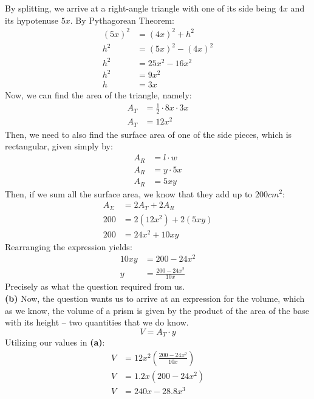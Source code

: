 \documentclass[hidelinks, a4paper, 12pt]{article}
\newcommand{\bd}{\textbf}
\newcommand{\n}{\\[\baselineskip]}
\begin{document}
            By splitting, we arrive at a right-angle triangle with one of its side being $4x$ and its hypotenuse $5x$. By Pythagorean Theorem:
            \[\begin{split}
                (5x)^2 &= (4x)^2 + h^2\\
                h^2 &= (5x)^2 - (4x)^2\\
                h^2 &= 25x^2 - 16x^2\\
                h^2 &= 9x^2\\
                h &= 3x
            \end{split}\]
            Now, we can find the area of the triangle, namely:
            \[\begin{split}
                A_T &= \frac{1}{2}\cdot 8x \cdot 3x\\
                A_T &= 12x^2
            \end{split}\]
            Then, we need to also find the surface area of one of the side pieces, which is rectangular, given simply by:
            \[\begin{split}
                A_R &= l \cdot w\\
                A_R &= y \cdot 5x\\
                A_R &= 5xy
            \end{split}\]
            Then, if we sum all the surface area, we know that they add up to $200cm^2$:
            \[\begin{split}
                A_\Sigma &= 2A_T + 2A_R\\
                200 &= 2(12x^2) + 2(5xy)\\
                200 &= 24x^2 + 10xy
            \end{split}\]
            Rearranging the expression yields:
            \[\begin{split}
                10xy &= 200 - 24x^2\\
                y &= \frac{200-24x^2}{10x}
            \end{split}\]
            Precisely as what the question required from us.\n
            \bd{(b)} Now, the question wants us to arrive at an expression for the volume, which as we know, the volume of a prism
            is given by the product of the area of the base with its height -- two quantities that we do know.
            \[V = A_T \cdot y\]
            Utilizing our values in \bd{(a)}:
            \[\begin{split}
                V &= 12x^2 \left(\frac{200-24x^2}{10x}\right)\\
                V &= 1.2x(200-24x^2)\\
                V &= 240x - 28.8x^3
            \end{split}\]
\end{document}
